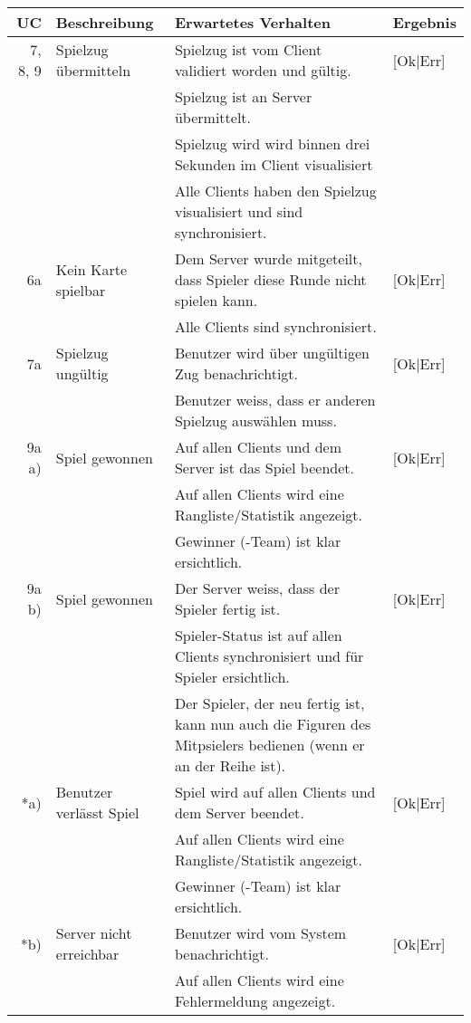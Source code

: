 \documentclass[12pt,halfparskip]{scrartcl}
\begin{document}

\begin {tabular}{r | p{3cm} | p{8cm} | l}
\toprule
\textbf{UC} & \textbf{Beschreibung} & \textbf{Erwartetes Verhalten} & \textbf{Ergebnis} \\
\midrule
7, 8, 9 & Spielzug übermitteln & Spielzug ist vom Client validiert worden und gültig. & [Ok|Err] \\
 \cline{3-4} & & Spielzug ist an Server übermittelt. & \\
 \cline{3-4} & & Spielzug wird wird binnen drei Sekunden im Client visualisiert & \\
 \cline{3-4} & & Alle Clients haben den Spielzug visualisiert und sind synchronisiert. & \\
\midrule
6a & Kein Karte spielbar & Dem Server wurde mitgeteilt, dass Spieler diese Runde nicht spielen kann. & [Ok|Err] \\
 \cline{3-4} & & Alle Clients sind synchronisiert. & \\
\midrule
7a & Spielzug ungültig & Benutzer wird über ungültigen Zug benachrichtigt. & [Ok|Err] \\
 \cline{3-4} & & Benutzer weiss, dass er anderen Spielzug auswählen muss. & \\
\midrule
9a a) & Spiel gewonnen & Auf allen Clients und dem Server ist das Spiel beendet. & [Ok|Err] \\
 \cline{3-4} & & Auf allen Clients wird eine Rangliste/Statistik angezeigt. & \\
 \cline{3-4} & & Gewinner (-Team) ist klar ersichtlich. & \\
\midrule
9a b) & Spiel gewonnen & Der Server weiss, dass der Spieler fertig ist. & [Ok|Err] \\
 \cline{3-4} & & Spieler-Status ist auf allen Clients synchronisiert und für Spieler ersichtlich. & \\
 \cline{3-4} & & Der Spieler, der neu fertig ist, kann nun auch die Figuren des Mitpsielers bedienen (wenn er an der Reihe ist). & \\
\midrule
*a) & Benutzer verlässt Spiel & Spiel wird auf allen Clients und dem Server beendet. & [Ok|Err] \\
 \cline{3-4} & & Auf allen Clients wird eine Rangliste/Statistik angezeigt. & \\
 \cline{3-4} & & Gewinner (-Team) ist klar ersichtlich. & \\
\midrule
*b) & Server nicht erreichbar & Benutzer wird vom System benachrichtigt. & [Ok|Err] \\
 \cline{3-4} & & Auf allen Clients wird eine Fehlermeldung angezeigt. & \\
\bottomrule
\end{tabular}
\end{document}
